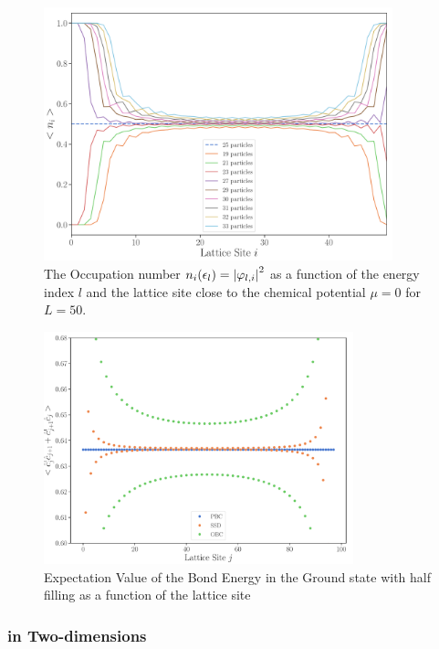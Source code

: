 \documentclass[11pt, a4paper]{article}
\theoremstyle{definition} %
\begin{document}
\begin{figure}[h]
\centering
\includegraphics[width=0.9\textwidth]{Occupation_number_H1}
\caption{The Occupation number $n_i(\epsilon_l) = \abs{\varphi_{l,i}}^2$ as a function of the energy index $l$ and the lattice site close to the chemical potential $\mu = 0$ for $L = 50$.}
\end{figure}




\begin{figure}[h]
	\centering
	\includegraphics[width=0.8\textwidth]{BondEnergy}
	\caption{Expectation Value of the Bond Energy in the Ground state with half filling as a function of the lattice site}
	\label{BondEnergy}
\end{figure}

\subsubsection{in Two-dimensions}
\end{document}
